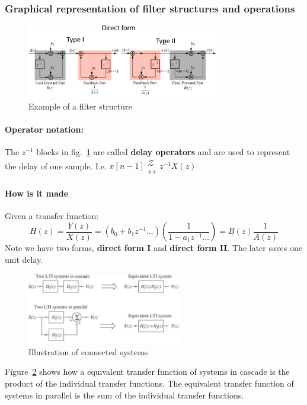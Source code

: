 \documentclass{article}
\begin{document}
\clearpage

\subsubsection{Graphical representation of filter structures and operations}

\begin{figure}[h!]
    \centering
    \includegraphics[width=0.75\textwidth]{figures/Filter design/structure_forms.png}
    \caption{Example of a filter structure}
    \label{fig:filter_structure}
\end{figure}

\paragraph{Operator notation:} The $z^{-1}$ blocks in fig.~\ref{fig:filter_structure} are called \textbf{delay operators} and are used to represent the delay of one sample. I.e. $x[n-1] \begin{smallmatrix} \mathcal{Z} \\ \longleftrightarrow \end{smallmatrix} z^{-1}X(z)$

\paragraph{How is it made} Given a transfer function: \[H(z) = \frac{Y(z)}{X(z)} = (b_0 + b_1z^{-1} \ldots) \left( \frac{1}{1-a_1z^{-1} \ldots} \right) = B(z)\frac{1}{A(z)}\]
Note we have two forms, \textbf{direct form I} and \textbf{direct form II}. The later saves one unit delay.

\begin{figure}[h!]
    \centering
    \includegraphics[width=0.6\textwidth]{figures/Filter design/connected_systems.png}
    \caption{Illustration of connected systems}
    \label{fig:connected_systems}
\end{figure}
Figure~\ref{fig:connected_systems} shows how a equivalent transfer function of systems in cascade is the product of the individual transfer functions. The equivalent transfer function of systems in parallel is the sum of the individual transfer functions.
\end{document}
